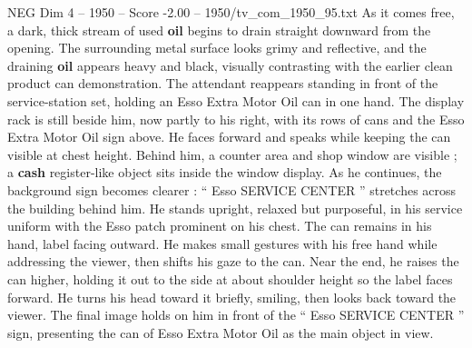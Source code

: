 \begin{textsample}{NEG Dim 4 – 1950 – Score -2.00 – 1950/tv\_com\_1950\_95.txt}
As it comes free, a dark, thick stream of used \textbf{oil} begins to drain straight downward from the opening.
The surrounding metal surface looks grimy and reflective, and the draining \textbf{oil} appears heavy and black, visually contrasting with the earlier clean product can demonstration.
The attendant reappears standing in front of the service-station set, holding an Esso Extra Motor Oil can in one hand.
The display rack is still beside him, now partly to his right, with its rows of cans and the Esso Extra Motor Oil sign above.
He faces forward and speaks while keeping the can visible at chest height.
Behind him, a counter area and shop window are visible ; a \textbf{cash} register-like object sits inside the window display.
As he continues, the background sign becomes clearer : “ Esso SERVICE CENTER ” stretches across the building behind him.
He stands upright, relaxed but purposeful, in his service uniform with the Esso patch prominent on his chest.
The can remains in his hand, label facing outward.
He makes small gestures with his free hand while addressing the viewer, then shifts his gaze to the can.
Near the end, he raises the can higher, holding it out to the side at about shoulder height so the label faces forward.
He turns his head toward it briefly, smiling, then looks back toward the viewer.
The final image holds on him in front of the “ Esso SERVICE CENTER ” sign, presenting the can of Esso Extra Motor Oil as the main object in view.

\end{textsample}

